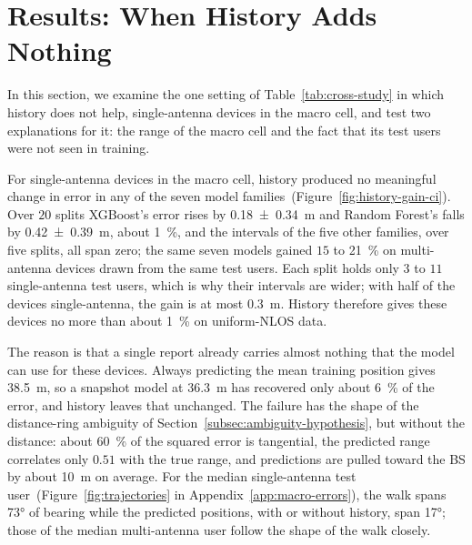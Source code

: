 \section{Results: When History Adds Nothing}
\label{sec:results-no-gain}

In this section, we examine the one setting of Table~\ref{tab:cross-study} in which history does not help, single-antenna devices in the macro cell, and test two explanations for it: the range of the macro cell and the fact that its test users were not seen in training.

For single-antenna devices in the macro cell, history produced no meaningful change in error in any of the seven model families~(Figure~\ref{fig:history-gain-ci}). Over $20$ splits XGBoost's error rises by \SI{0.18 +- 0.34}{\meter} and Random Forest's falls by \SI{0.42 +- 0.39}{\meter}, about \SI{1}{\percent}, and the intervals of the five other families, over five splits, all span zero; the same seven models gained $15$ to \SI{21}{\percent} on multi-antenna devices drawn from the same test users. Each split holds only $3$ to $11$ single-antenna test users, which is why their intervals are wider; with half of the devices single-antenna, the gain is at most \SI{0.3}{\meter}. History therefore gives these devices no more than about \SI{1}{\percent} on uniform-NLOS data.

The reason is that a single report already carries almost nothing that the model can use for these devices. Always predicting the mean training position gives \SI{38.5}{\meter}, so a snapshot model at \SI{36.3}{\meter} has recovered only about \SI{6}{\percent} of the error, and history leaves that unchanged. The failure has the shape of the distance-ring ambiguity of Section~\ref{subsec:ambiguity-hypothesis}, but without the distance: about \SI{60}{\percent} of the squared error is tangential, the predicted range correlates only $0.51$ with the true range, and predictions are pulled toward the BS by about \SI{10}{\meter} on average. For the median single-antenna test user~(Figure~\ref{fig:trajectories} in Appendix~\ref{app:macro-errors}), the walk spans \ang{73} of bearing while the predicted positions, with or without history, span \ang{17}; those of the median multi-antenna user follow the shape of the walk closely.


